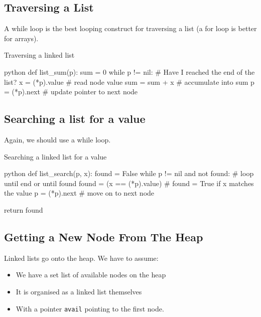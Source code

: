 \subsection{Traversing a List}\label{sub:traversing_a_list}

A while loop is the best looping construct for traversing a list (a for loop is better for arrays).

\begin{highlight}{Traversing a linked list}
	\begin{code}{python}
		def list_sum(p):
		sum = 0
		while p != nil: # Have I reached the end of the list?
		x = (*p).value # read node value
		sum = sum + x # accumulate into sum
		p = (*p).next # update pointer to next node
	\end{code}
\end{highlight}

\subsection{Searching a list for a value}\label{sub:searching_a_list_for_a_value}

Again, we should use a while loop.

\begin{highlight}{Searching a linked list for a value}
	\begin{code}{python}
		def list_search(p, x):
		found = False
		while p != nil and not found: # loop until end or until found
		found = (x == (*p).value) # found = True if x matches the value
		p = (*p).next # move on to next node

		return found
	\end{code}
\end{highlight}

\subsection{Getting a New Node From The Heap}\label{sub:getting_a_new_node_from_the_heap}

Linked lists go onto the heap.
We have to assume:
\begin{itemize}
	\item We have a set list of available nodes on the heap
	\item It is organised as a linked list themselves
	\item With a pointer \texttt{avail} pointing to the first node.
\end{itemize}

